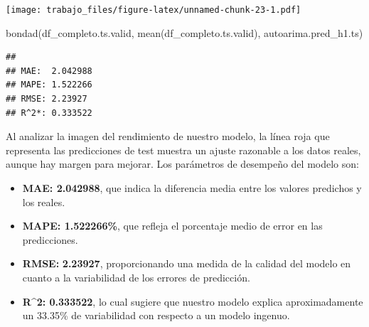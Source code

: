 \documentclass[
]{article}
\newenvironment{Shaded}{\begin{snugshade}}{\end{snugshade}}
\newcommand{\AttributeTok}[1]{\textcolor[rgb]{0.77,0.63,0.00}{#1}}
\newcommand{\DecValTok}[1]{\textcolor[rgb]{0.00,0.00,0.81}{#1}}
\newcommand{\FunctionTok}[1]{\textcolor[rgb]{0.00,0.00,0.00}{#1}}
\newcommand{\NormalTok}[1]{#1}
\newcommand{\OtherTok}[1]{\textcolor[rgb]{0.56,0.35,0.01}{#1}}
\newcommand{\SpecialCharTok}[1]{\textcolor[rgb]{0.00,0.00,0.00}{#1}}
\newcommand{\StringTok}[1]{\textcolor[rgb]{0.31,0.60,0.02}{#1}}
\begin{document}
\begin{Shaded}
\end{Shaded}

\texttt{[image: trabajo\_files/figure-latex/unnamed-chunk-23-1.pdf]}

\begin{Shaded}
\begin{Highlighting}[]
\FunctionTok{bondad}\NormalTok{(df\_completo.ts.valid, }\FunctionTok{mean}\NormalTok{(df\_completo.ts.valid), autoarima.pred\_h1.ts) }
\end{Highlighting}
\end{Shaded}

\begin{verbatim}
## 
## MAE:  2.042988 
## MAPE: 1.522266 
## RMSE: 2.23927 
## R^2*: 0.333522
\end{verbatim}

Al analizar la imagen del rendimiento de nuestro modelo, la línea roja
que representa las predicciones de test muestra un ajuste razonable a
los datos reales, aunque hay margen para mejorar. Los parámetros de
desempeño del modelo son:

\begin{itemize}
\item
  \textbf{MAE: 2.042988}, que indica la diferencia media entre los
  valores predichos y los reales.
\item
  \textbf{MAPE: 1.522266\%}, que refleja el porcentaje medio de error en
  las predicciones.
\item
  \textbf{RMSE:} \textbf{2.23927}, proporcionando una medida de la
  calidad del modelo en cuanto a la variabilidad de los errores de
  predicción.
\item
  \textbf{R\^{}2: 0.333522}, lo cual sugiere que nuestro modelo explica
  aproximadamente un 33.35\% de variabilidad con respecto a un modelo
  ingenuo.
\end{itemize}
\end{document}
